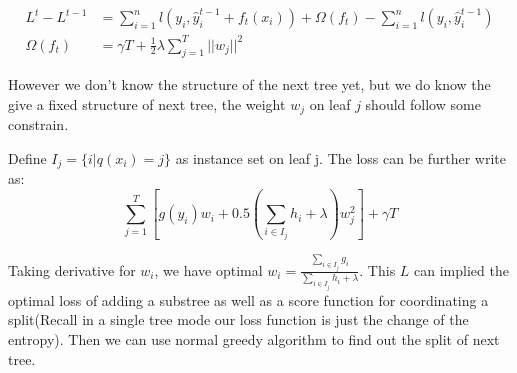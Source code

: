 \begin{equation}
  \begin{aligned}
    L^t - L^{t-1} &= \sum_{i=1}^n l(y_i, \hat{y}_i^{t-1} + f_t(x_i)) + \Omega(f_t) -  \sum_{i=1}^n l(y_i, \hat{y}_i^{t-1})\\
    \Omega(f_t) &= \gamma T + \frac{1}{2} \lambda \sum_{j=1}^{T}||w_j||^2
  \end{aligned}
\end{equation}

However we don't know the structure of the next tree yet, but we do know the give a fixed structure of next tree, the weight $w_j$ on leaf $j$ should follow some constrain.

Define $I_j = \{i|q(x_i) = j\}$ as instance set on leaf j.
The loss can be further write as:
\begin{equation}
  \sum_{j=1}^T [g(y_i) w_i + 0.5(\sum_{i\in I_j} h_i + \lambda) w_j^2] + \gamma T
\end{equation}

Taking derivative for $w_i$, we have optimal $w_i = \frac{\sum_{i\in I_j} g_i}{\sum_{i\in I_j} h_i + \lambda}$. {\color{blue}This $L$ can implied the optimal loss of adding a substree as well as a score function for coordinating a split(Recall in a single tree mode our loss function is just the change of the entropy)}. Then we can use normal greedy algorithm to find out the split of next tree.
